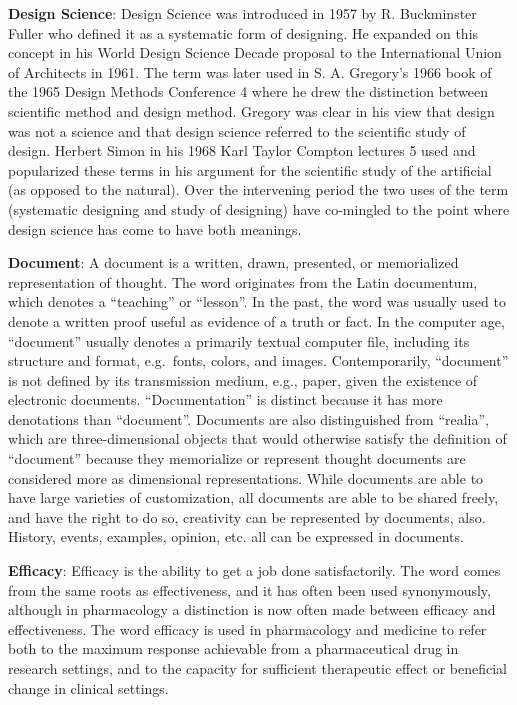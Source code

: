 \documentclass[]{book}
\theoremstyle{definition}
\theoremstyle{definition}
\theoremstyle{definition}
\theoremstyle{remark}
\begin{document}
\textbf{Design Science}: Design Science was introduced in 1957 by R.
Buckminster Fuller who defined it as a systematic form of designing. He
expanded on this concept in his World Design Science Decade proposal to
the International Union of Architects in 1961. The term was later used
in S. A. Gregory's 1966 book of the 1965 Design Methods Conference 4
where he drew the distinction between scientific method and design
method. Gregory was clear in his view that design was not a science and
that design science referred to the scientific study of design. Herbert
Simon in his 1968 Karl Taylor Compton lectures 5 used and popularized
these terms in his argument for the scientific study of the artificial
(as opposed to the natural). Over the intervening period the two uses of
the term (systematic designing and study of designing) have co-mingled
to the point where design science has come to have both meanings.

\textbf{Document}: A document is a written, drawn, presented, or
memorialized representation of thought. The word originates from the
Latin documentum, which denotes a ``teaching'' or ``lesson''. In the
past, the word was usually used to denote a written proof useful as
evidence of a truth or fact. In the computer age, ``document'' usually
denotes a primarily textual computer file, including its structure and
format, e.g.~fonts, colors, and images. Contemporarily, ``document'' is
not defined by its transmission medium, e.g., paper, given the existence
of electronic documents. ``Documentation'' is distinct because it has
more denotations than ``document''. Documents are also distinguished
from ``realia'', which are three-dimensional objects that would
otherwise satisfy the definition of ``document'' because they
memorialize or represent thought documents are considered more as
dimensional representations. While documents are able to have large
varieties of customization, all documents are able to be shared freely,
and have the right to do so, creativity can be represented by documents,
also. History, events, examples, opinion, etc. all can be expressed in
documents.

\textbf{Efficacy}: Efficacy is the ability to get a job done
satisfactorily. The word comes from the same roots as effectiveness, and
it has often been used synonymously, although in pharmacology a
distinction is now often made between efficacy and effectiveness. The
word efficacy is used in pharmacology and medicine to refer both to the
maximum response achievable from a pharmaceutical drug in research
settings, and to the capacity for sufficient therapeutic effect or
beneficial change in clinical settings.
\end{document}
